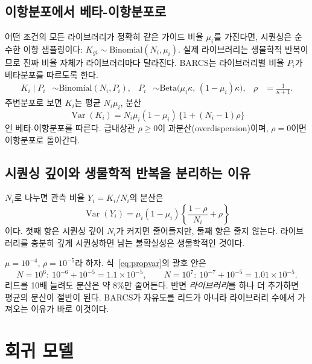 \documentclass[11pt]{article}
\newcommand{\Var}{\operatorname{Var}}
\begin{document}
\subsection{이항분포에서 베타-이항분포로}

어떤 조건의 모든 라이브러리가 정확히 같은 가이드 비율 $\mu_i$를 가진다면,
시퀀싱은 순수한 이항 샘플링이다: $K_{gi}\sim\mathrm{Binomial}(N_i,\mu_i)$.
실제 라이브러리는 생물학적 반복이므로 진짜 비율 자체가 라이브러리마다 달라진다.
BARCS는 라이브러리별 비율 $P_i$가 베타분포를 따르도록 한다.
\begin{align}
K_i \mid P_i &\sim \mathrm{Binomial}(N_i, P_i), &
P_i &\sim \mathrm{Beta}\big(\mu_i\kappa,\,(1-\mu_i)\kappa\big), &
\rho &= \frac{1}{\kappa+1}.
\end{align}
주변분포로 보면 $K_i$는 평균 $N_i\mu_i$, 분산
\begin{equation}
\Var(K_i) = N_i\mu_i(1-\mu_i)\,\{1+(N_i-1)\rho\}
\label{eq:var}
\end{equation}
인 베타-이항분포를 따른다. 급내상관 $\rho\ge0$이 과분산(overdispersion)이며,
$\rho=0$이면 이항분포로 돌아간다.

\subsection{시퀀싱 깊이와 생물학적 반복을 분리하는 이유}

$N_i$로 나누면 관측 비율 $Y_i=K_i/N_i$의 분산은
\begin{equation}
\Var(Y_i)=\mu_i(1-\mu_i)\left\{\frac{1-\rho}{N_i}+\rho\right\}
\label{eq:propvar}
\end{equation}
이다. 첫째 항은 시퀀싱 깊이 $N_i$가 커지면 줄어들지만, 둘째 항은 줄지 않는다.
라이브러리를 충분히 깊게 시퀀싱하면 남는 불확실성은 생물학적인 것이다.

\begin{example}
$\mu=10^{-4}$, $\rho=10^{-5}$라 하자. 식~\eqref{eq:propvar}의 괄호 안은
\[
N=10^6:\ 10^{-6}+10^{-5}=1.1\times10^{-5},\qquad
N=10^7:\ 10^{-7}+10^{-5}=1.01\times10^{-5}.
\]
리드를 10배 늘려도 분산은 약 8\%만 줄어든다. 반면 \emph{라이브러리}를 하나 더
추가하면 평균의 분산이 절반이 된다. BARCS가 자유도를 리드가 아니라 라이브러리
수에서 가져오는 이유가 바로 이것이다.
\end{example}

\section{회귀 모델}
\end{document}
